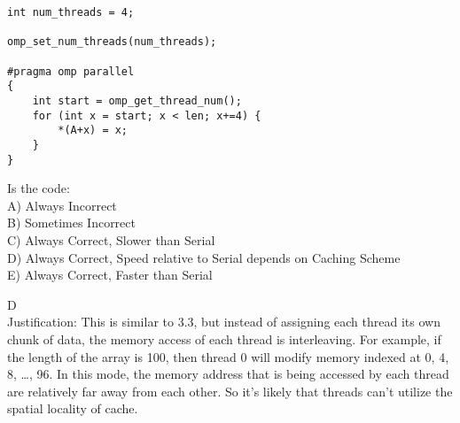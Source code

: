 \begin{blocksection}

\question
\begin{verbatim}
int num_threads = 4; 

omp_set_num_threads(num_threads); 

#pragma omp parallel 
{ 
    int start = omp_get_thread_num(); 
    for (int x = start; x < len; x+=4) { 
        *(A+x) = x; 
    } 
} 

\end{verbatim}

Is the code: \\
A) Always Incorrect \\
B) Sometimes Incorrect \\ 
C) Always Correct, Slower than Serial \\
D) Always Correct, Speed relative to Serial depends on Caching Scheme \\
E) Always Correct, Faster than Serial \\

\begin{solution}[0.5in]
D \\
Justification: This is similar to 3.3, but instead of assigning each thread its own chunk of data, the memory access of each thread is interleaving. For example, if the length of the array is 100, then thread 0 will modify memory indexed at 0, 4, 8, …, 96. In this mode, the memory address that is being accessed by each thread are relatively far away from each other. So it’s likely that threads can’t utilize the spatial locality of cache. 

\end{solution}
\end{blocksection}